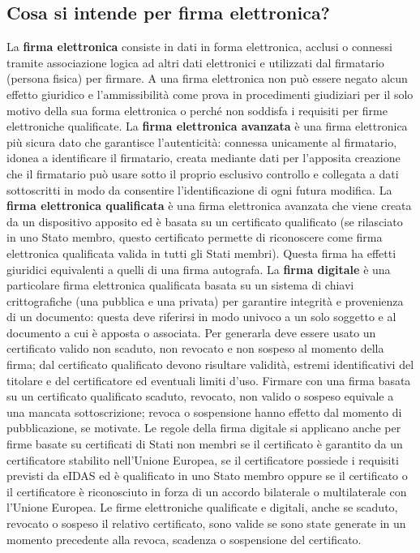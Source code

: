 \subsection{Cosa si intende per firma elettronica?}
La \textbf{firma elettronica} consiste in dati in forma elettronica, acclusi o connessi tramite associazione
logica ad altri dati elettronici e utilizzati dal firmatario (persona fisica) per firmare.
A una firma elettronica non può essere negato alcun effetto giuridico e l'ammissibilità
come prova in procedimenti giudiziari per il solo motivo della sua forma elettronica
o perché non soddisfa i requisiti per firme elettroniche qualificate.
\newline
La \textbf{firma elettronica avanzata} è una firma elettronica più sicura dato che garantisce l'autenticità:
connessa unicamente al firmatario, idonea a identificare il firmatario,
creata mediante dati per l'apposita creazione che il firmatario può usare sotto
il proprio esclusivo controllo e collegata a dati sottoscritti in modo da
consentire l'identificazione di ogni futura modifica.
\newline
La \textbf{firma elettronica qualificata} è una firma elettronica avanzata che viene
creata da un dispositivo apposito ed è basata su un certificato qualificato
(se rilasciato in uno Stato membro, questo certificato permette di riconoscere
come firma elettronica qualificata valida in tutti gli Stati membri).
Questa firma ha effetti giuridici equivalenti a quelli di una firma autografa.
\newline
La \textbf{firma digitale} è una particolare firma elettronica qualificata basata
su un sistema di chiavi crittografiche (una pubblica e una privata) per garantire
integrità e provenienza di un documento: questa deve riferirsi in modo univoco
a un solo soggetto e al documento a cui è apposta o associata.
Per generarla deve essere usato un certificato valido non scaduto, non revocato
e non sospeso al momento della firma; dal certificato qualificato devono risultare validità,
estremi identificativi del titolare e del certificatore ed eventuali limiti d'uso.
Firmare con una firma basata su un certificato qualificato scaduto,
revocato, non valido o sospeso equivale a una mancata sottoscrizione;
revoca o sospensione hanno effetto dal momento di pubblicazione, se motivate.
Le regole della firma digitale si applicano anche per firme basate su certificati
di Stati non membri se il certificato è garantito da un certificatore stabilito
nell'Unione Europea, se il certificatore possiede i requisiti previsti da eIDAS
ed è qualificato in uno Stato membro oppure se il certificato o il certificatore
è riconosciuto in forza di un accordo bilaterale o multilaterale con l'Unione Europea.
Le firme elettroniche qualificate e digitali, anche se scaduto, revocato o sospeso il
relativo certificato, sono valide se sono state generate in un momento precedente alla
revoca, scadenza o sospensione del certificato.

